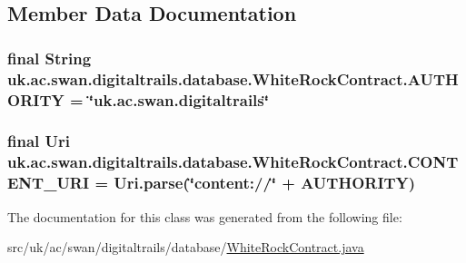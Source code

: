 \subsection{Member Data Documentation}
\hypertarget{classuk_1_1ac_1_1swan_1_1digitaltrails_1_1database_1_1_white_rock_contract_a94bf16e0a89f76da95bb2ffe76bafeea}{
\subsubsection[{A\+U\+T\+H\+O\+R\+I\+T\+Y}]{\setlength{\rightskip}{0pt plus 5cm}final String uk.\+ac.\+swan.\+digitaltrails.\+database.\+White\+Rock\+Contract.\+A\+U\+T\+H\+O\+R\+I\+T\+Y = \char`\"{}uk.\+ac.\+swan.\+digitaltrails\char`\"{}\hspace{0.3cm}{\ttfamily [static]}}}\label{classuk_1_1ac_1_1swan_1_1digitaltrails_1_1database_1_1_white_rock_contract_a94bf16e0a89f76da95bb2ffe76bafeea}
\hypertarget{classuk_1_1ac_1_1swan_1_1digitaltrails_1_1database_1_1_white_rock_contract_abfe96759bfe16773a98099536eef2306}{
\subsubsection[{C\+O\+N\+T\+E\+N\+T\+\_\+\+U\+R\+I}]{\setlength{\rightskip}{0pt plus 5cm}final Uri uk.\+ac.\+swan.\+digitaltrails.\+database.\+White\+Rock\+Contract.\+C\+O\+N\+T\+E\+N\+T\+\_\+\+U\+R\+I = Uri.\+parse(\char`\"{}content\+://\char`\"{} + A\+U\+T\+H\+O\+R\+I\+T\+Y)\hspace{0.3cm}{\ttfamily [static]}}}\label{classuk_1_1ac_1_1swan_1_1digitaltrails_1_1database_1_1_white_rock_contract_abfe96759bfe16773a98099536eef2306}


The documentation for this class was generated from the following file\+:\begin{DoxyCompactItemize}
\item 
src/uk/ac/swan/digitaltrails/database/\hyperlink{_white_rock_contract_8java}{White\+Rock\+Contract.\+java}\end{DoxyCompactItemize}
